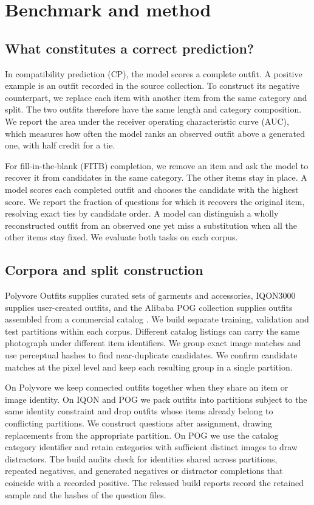 \documentclass[preprint,12pt]{elsarticle}
\begin{document}
\section{Benchmark and method}
\label{sec:method}

\subsection{What constitutes a correct prediction?}
In compatibility prediction (CP), the model scores a complete outfit. A positive example
is an outfit recorded in the source collection. To construct its negative counterpart,
we replace each item with another item from the same category and split. The two outfits
therefore have the same length and category composition. We report the area under the
receiver operating characteristic curve (AUC), which measures how often the model ranks
an observed outfit above a generated one, with half credit for a tie.

For fill-in-the-blank (FITB) completion, we remove an item and ask the model to recover it from candidates in the same category. The other items stay in place. A model scores each completed outfit and chooses the candidate with the
highest score. We report the fraction of questions for which it recovers the original
item, resolving exact ties by candidate order. A model can distinguish a wholly
reconstructed outfit from an observed one yet miss a substitution when all the other
items stay fixed. We evaluate both tasks on each corpus.

\subsection{Corpora and split construction}
Polyvore Outfits supplies curated sets of garments and accessories, IQON3000 supplies
user-created outfits, and the Alibaba POG collection supplies outfits assembled from a
commercial catalog \cite{vasileva2018typeaware,song2019gpbpr,chen2019pog}. We build
separate training, validation and test partitions within each corpus. Different catalog listings can carry the same photograph under different item identifiers. We group exact image matches and use perceptual hashes to
find near-duplicate candidates. We confirm candidate matches at the pixel level and keep each resulting group in a single partition.

On Polyvore we keep connected outfits together when they share an item or image
identity. On IQON and POG we pack outfits into partitions subject to the same identity
constraint and drop outfits whose items already belong to conflicting partitions.
We construct questions after assignment, drawing replacements from the appropriate
partition. On POG we use the catalog category identifier and retain categories with
sufficient distinct images to draw distractors. The build audits check for identities
shared across partitions, repeated negatives, and generated negatives or distractor
completions that coincide with a recorded positive. The released build reports record
the retained sample and the hashes of the question files.
\end{document}
